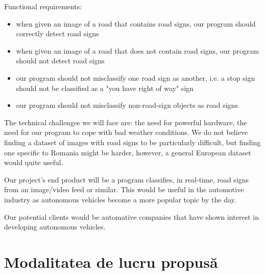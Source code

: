 \documentclass{article}
\begin{document}
Functional requirements:
\begin{itemize}
  \item when given an image of a road that contains road signs, our program should correctly detect road signs
  \item when given an image of a road that does not contain road signs, our program should not detect road signs
  \item our program should not misclassify one road sign as another, i.e. a stop sign should not be classified as
  a "you have right of way" sign
  \item our program should not misclassify non-road-sign objects as road signs
\end{itemize}

The technical challenges we will face are: the need for powerful hardware, the need for our program to cope
with bad weather conditions. We do not believe finding a dataset of images with road signs to be particularly
difficult, but finding one specific to Romania might be harder, however, a general European dataset would
quite useful.


Our project's end product will be a program classifies, in real-time, road signs from an image/video feed or similar.
This would be useful in the automotive industry as autonomous vehicles become a more popular topic by the day.

Our potential clients would be automative companies that have shown interest in developing autonomous vehicles.

\section{Modalitatea de lucru propusă}



\end{document}
